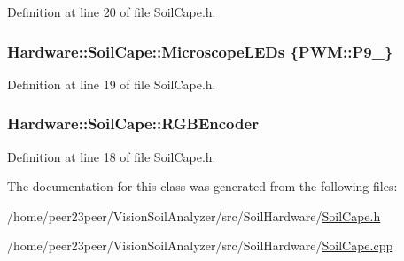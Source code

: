 Definition at line 20 of file Soil\+Cape.\+h.

\hypertarget{class_hardware_1_1_soil_cape_a80d499485dddb861cddaffa439b655dd}{}
\subsubsection[{Microscope\+L\+E\+Ds}]{ Hardware\+::\+Soil\+Cape\+::\+Microscope\+L\+E\+Ds \{{\bf P\+W\+M\+::\+P9\+\_}\}}\label{class_hardware_1_1_soil_cape_a80d499485dddb861cddaffa439b655dd}


Definition at line 19 of file Soil\+Cape.\+h.

\hypertarget{class_hardware_1_1_soil_cape_a0e68dc6f30fdcbff0462d2996e47a338}{}
\subsubsection[{R\+G\+B\+Encoder}]{ Hardware\+::\+Soil\+Cape\+::\+R\+G\+B\+Encoder}\label{class_hardware_1_1_soil_cape_a0e68dc6f30fdcbff0462d2996e47a338}


Definition at line 18 of file Soil\+Cape.\+h.



The documentation for this class was generated from the following files\+:\begin{DoxyCompactItemize}
\item 
/home/peer23peer/\+Vision\+Soil\+Analyzer/src/\+Soil\+Hardware/\hyperlink{_soil_cape_8h}{Soil\+Cape.\+h}\item 
/home/peer23peer/\+Vision\+Soil\+Analyzer/src/\+Soil\+Hardware/\hyperlink{_soil_cape_8cpp}{Soil\+Cape.\+cpp}\end{DoxyCompactItemize}
